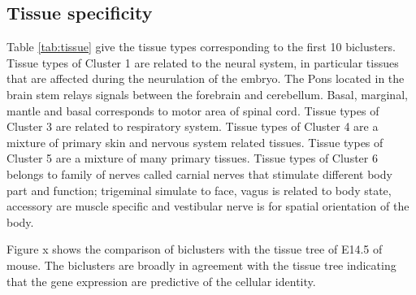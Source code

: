 \documentclass{article}
\begin{document}
\subsection{Tissue specificity}
Table \ref{tab:tissue} give the tissue types corresponding to the first 10 biclusters. Tissue types of Cluster 1 are related to the neural system, in particular
tissues that are affected during the neurulation of the embryo. The Pons located in the brain stem relays signals between the forebrain and cerebellum. 
Basal, marginal, mantle and basal corresponds to motor area of spinal cord.
Tissue types of Cluster 3 are related to respiratory system.
Tissue types of Cluster 4 are a mixture of primary skin and nervous system related tissues.
Tissue types of Cluster 5 are a mixture of many primary tissues.
Tissue types of Cluster 6 belongs to family of nerves called carnial nerves that stimulate different body part and function; 
trigeminal simulate to face,
vagus is related to body state, accessory are muscle specific and vestibular nerve is for spatial orientation of 
the body.



Figure x shows the comparison of biclusters with the tissue tree of E14.5 of mouse. The biclusters are
broadly in agreement with the tissue tree indicating that the gene expression 
are predictive of the cellular identity.
\end{document}
